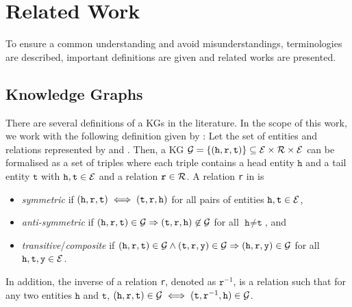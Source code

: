 \chapter{Related Work}
\label{ch:relatedwork}

To ensure a common understanding and avoid misunderstandings, terminologies are described, important definitions are given and related works are presented.

\section{Knowledge Graphs} 
There are several definitions of a \acp{KG} in the literature. 
In the scope of this work, we work with the following definition given by \cite{ConEx}:
Let the set of entities and relations represented by \entities and \relations.
Then, a \ac{KG} $\mathcal{G}= \{(\texttt{h}, \texttt{r}, \texttt{t}) \}  \subseteq \mathcal{E} \times \mathcal{R} \times \mathcal{E}$ can be formalised as a set of triples where each triple contains a head entity $\texttt{h}$ and a tail entity $\texttt{t}$ with $\texttt{h}, \texttt{t} \in \mathcal{E}$ and a relation $\texttt{r} \in \mathcal{R}$. 
A relation \texttt{r} in \kg is
\begin{itemize}
    \item 
    \emph{symmetric} if $(\texttt{h}, \texttt{r}, \texttt{t}) \iff (\texttt{t}, \texttt{r}, \texttt{h})$ for all pairs of entities $\texttt{h},\texttt{t}\in \mathcal{E}$, 
   
   \item 
   \emph{anti-symmetric} if $(\texttt{h}, \texttt{r}, \texttt{t}) \in \mathcal{G} \Rightarrow (\texttt{t}, \texttt{r}, \texttt{h}) \not \in \mathcal{G}$ for all $\texttt{h} \not= \texttt{t}$, and
    
    \item 
    \emph{transitive}/\emph{composite} if $(\texttt{h}, \texttt{r}, \texttt{t})\in\mathcal{G} \wedge (\texttt{t}, \texttt{r}, \texttt{y}) \in \mathcal{G}  \Rightarrow (\texttt{h}, \texttt{r}, \texttt{y}) \in \mathcal{G}$ for all $\texttt{h},\texttt{t},\texttt{y}\in \mathcal{E}$.
\end{itemize}
In addition, the inverse of a relation \texttt{r}, denoted as $\texttt{r}^{-1}$, is a relation such that for any two entities $\texttt{h}$ and $\texttt{t}$, $(\texttt{h}, \texttt{r}, \texttt{t}) \in \mathcal{G} \iff (\texttt{t},\texttt{r}^{-1},\texttt{h}) \in \mathcal{G} $.

